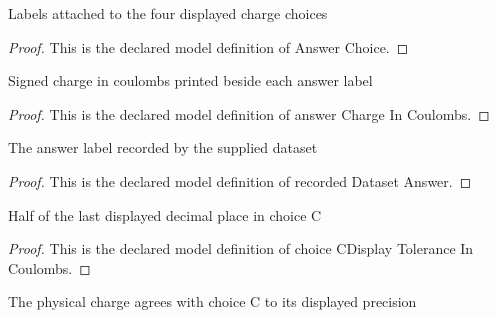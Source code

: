 \begin{definition}
  \label{def:physics:phyx-mini-0912:phyxminiproblems-problemphyxmini0912-answerchoice}
  Labels attached to the four displayed charge choices
\end{definition}
\begin{proof}
  This is the declared model definition of Answer Choice.
\end{proof}
\begin{definition}
  \label{def:physics:phyx-mini-0912:phyxminiproblems-problemphyxmini0912-answerchargeincoulombs}
  Signed charge in coulombs printed beside each answer label
\end{definition}
\begin{proof}
  This is the declared model definition of answer Charge In Coulombs.
\end{proof}
\begin{definition}
  \label{def:physics:phyx-mini-0912:phyxminiproblems-problemphyxmini0912-recordeddatasetanswer}
  The answer label recorded by the supplied dataset
\end{definition}
\begin{proof}
  This is the declared model definition of recorded Dataset Answer.
\end{proof}
\begin{definition}
  \label{def:physics:phyx-mini-0912:phyxminiproblems-problemphyxmini0912-choicecdisplaytoleranceincoulombs}
  Half of the last displayed decimal place in choice C
\end{definition}
\begin{proof}
  This is the declared model definition of choice CDisplay Tolerance In Coulombs.
\end{proof}
\begin{definition}
  \label{def:physics:phyx-mini-0912:phyxminiproblems-problemphyxmini0912-ballchargeroundstochoicec}
  The physical charge agrees with choice C to its displayed precision
\end{definition}
